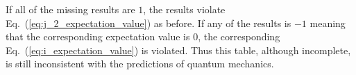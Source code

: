\documentclass[english,reprint, aps, prl,superscriptaddress, showpacs,
showkeys, longbibliography, amsmath, amssymb, floatfix]{revtex4-1}
\theoremstyle{plain}
\theoremstyle{definition}
\newcommand{\missing}{?}
\begin{document}

\noindent If all of the missing results are $1$, the results violate
Eq.~(\ref{eq:j_2_expectation_value}) as before. If any of the results
is $-1$ meaning that the corresponding expectation value is 0,
the corresponding Eq.~(\ref{eq:i_expectation_value}) is violated. Thus
this table, although incomplete, is still inconsistent with the
predictions of quantum mechanics. 
\end{document}
